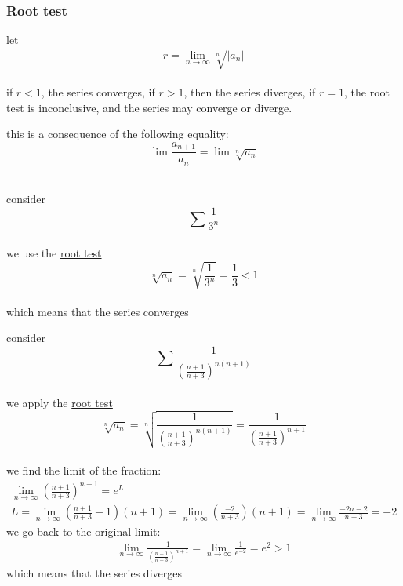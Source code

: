 \documentclass[a4paper,12pt]{article}
\newcommand{\?}{\stackrel{?}{=}}
\begin{document}
\subsubsection{Root test}
\label{sec:org88b6001}
\begin{definition}
let\\[0pt]
\[
  r = \lim_{n\to\infty} \sqrt[n]{|a_n|}
\]\\[0pt]
if \(r < 1\), the series converges, if \(r > 1\), then the series diverges, if \(r = 1\), the root test is inconclusive, and the series may converge or diverge.\\[0pt]

\begin{note}
this is a consequence of the following equality:\\[0pt]
\[
  \lim \frac{a_{n+1}}{a_n} = \lim \sqrt[n]{a_n}
\]\\[0pt]
\end{note}

\begin{my_example}
consider\\[0pt]
\[
  \sum \frac{1}{3^n}
\]\\[0pt]
we use the \hyperref[sec:org88b6001]{root test}\\[0pt]
\[
\sqrt[n]{a_n} = \sqrt[n]{\frac{1}{3^n}} = \frac13 < 1
\]\\[0pt]
which means that the series converges\\[0pt]
\end{my_example}

\begin{my_example}
consider\\[0pt]
\[
\sum \frac{1}{\left(\frac{n+1}{n+3}\right)^{n(n+1)}}
\]\\[0pt]
we apply the \hyperref[sec:org88b6001]{root test}\\[0pt]
\[
  \sqrt[n]{a_n} = \sqrt[n]{\frac{1}{\left(\frac{n+1}{n+3}\right)^{n(n+1)}}} = \frac{1}{\left(\frac{n+1}{n+3}\right)^{n+1}}
\]\\[0pt]
we find the limit of the fraction:\\[0pt]
\begin{gather*}
  \lim_{n\to\infty} \left(\frac{n+1}{n+3}\right)^{n+1} = e^L\\
  L = \lim_{n\to\infty} \left(\frac{n+1}{n+3}-1\right)(n+1) = \lim_{n\to\infty} \left(\frac{-2}{n+3}\right)(n+1) = \lim_{n\to\infty} \frac{-2n-2}{n+3} = -2
\end{gather*}
we go back to the original limit:\\[0pt]
\begin{gather*}
  \lim_{n\to\infty} \frac{1}{\left(\frac{n+1}{n+3}\right)^{n+1}} = \lim_{n\to\infty} \frac{1}{e^{-2}} = e^2 > 1
\end{gather*}
which means that the series diverges\\[0pt]
\end{my_example}


\end{definition}
\end{document}
